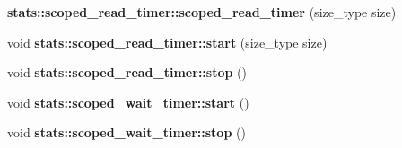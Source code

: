 \begin{CompactItemize}
\item 
\hypertarget{group__iolayer_gdab3106becfe40ec7a5212eb1c06c3b3}{
\textbf{stats::scoped\_\-read\_\-timer::scoped\_\-read\_\-timer} (size\_\-type size)}
\label{group__iolayer_gdab3106becfe40ec7a5212eb1c06c3b3}

\item 
\hypertarget{group__iolayer_g067fa76f2b08be88c122b3c18c80885a}{
void \textbf{stats::scoped\_\-read\_\-timer::start} (size\_\-type size)}
\label{group__iolayer_g067fa76f2b08be88c122b3c18c80885a}

\item 
\hypertarget{group__iolayer_g5729db82645a1b9d8d316d1b3eeecbbb}{
void \textbf{stats::scoped\_\-read\_\-timer::stop} ()}
\label{group__iolayer_g5729db82645a1b9d8d316d1b3eeecbbb}

\item 
\hypertarget{group__iolayer_gff7b781142829e08050ff83c940ba765}{
void \textbf{stats::scoped\_\-wait\_\-timer::start} ()}
\label{group__iolayer_gff7b781142829e08050ff83c940ba765}

\item 
\hypertarget{group__iolayer_g6a3638e8e9a015fa0bd1678185deab15}{
void \textbf{stats::scoped\_\-wait\_\-timer::stop} ()}
\label{group__iolayer_g6a3638e8e9a015fa0bd1678185deab15}


\end{CompactItemize}
